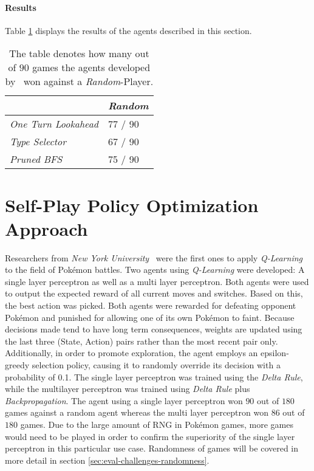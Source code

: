 \paragraph{Results}
Table \ref{tbl:AI-Comp-Results} displays the results of the agents described in this section. 
\begin{table}[h]
    \centering
        \caption{The table denotes how many out of $90$ games the agents developed by~\cite{Lee_Togelius_2017}
        won against a \textit{Random}-Player.}
        \label{tbl:AI-Comp-Results}
        \begin{tabular}{|l|l|}
            \hline
            & \emph{Random} \\
            \hline
            \emph{One Turn Lookahead} & 77 / 90 \\
            \hline
            \emph{Type Selector} & 67 / 90 \\
            \hline
            \emph{Pruned BFS} & 75 / 90 \\
            \hline
        \end{tabular}
\end{table}

\section{Self-Play Policy Optimization Approach}
Researchers from \textit{New York University}~\autocite{Lee_Togelius_2017} were the first ones to apply
\textit{Q-Learning} to the field of Pokémon battles. Two agents using \textit{Q-Learning}
were developed: A single layer perceptron as well as a multi layer perceptron. Both agents were 
used to output the expected reward of all current moves and switches. Based on this, the best 
action was picked. Both agents were rewarded for defeating opponent Pokémon and punished for 
allowing one of its own Pokémon to faint. Because decisions made tend to have long term consequences, 
weights are updated using the last three (State, Action) pairs rather than the most recent pair only.
Additionally, in order to promote exploration, the agent employs an epsilon-greedy selection policy, 
causing it to randomly override its decision with a probability of 0.1. The single layer perceptron 
was trained using the \textit{Delta Rule}, while the multilayer perceptron was trained using \textit{Delta Rule} 
plus \textit{Backpropagation}. The agent using a single layer perceptron won $90$ out of $180$ games against a
random agent whereas the multi layer perceptron won 86 out of $180$ games. Due to the large amount
of \ac{RNG} in Pokémon games, more games would need to be played in order to confirm the superiority
of the single layer perceptron in this particular use case. Randomness of games will be covered
in more detail in section \ref{sec:eval-challenges-randomness}.

